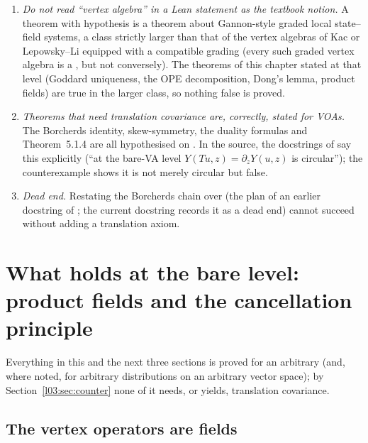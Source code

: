 \begin{warning}[title={Consequences for the reader}]
\begin{enumerate}
\item \emph{Do not read ``vertex algebra'' in a Lean statement as the textbook notion.} A theorem
  with hypothesis  is a theorem about Gannon-style graded local
  state--field systems, a class strictly larger than that of the vertex algebras of Kac or
  Lepowsky--Li equipped with a compatible grading (every such graded vertex algebra is a
  , but not conversely). The theorems of this chapter
  stated at that level (Goddard uniqueness, the OPE decomposition, Dong's lemma, product fields)
  are true in the larger class, so nothing false is proved.
\item \emph{Theorems that need translation covariance are, correctly, stated for VOAs.} The
  Borcherds identity, skew-symmetry, the duality formulas and Theorem~5.1.4 are all hypothesised
  on . In the source, the docstrings of
   say this explicitly (``at the bare-VA
  level $Y(Tu,z) = \partial_zY(u,z)$ is circular''); the counterexample shows it is not merely
  circular but false.
\item \emph{Dead end.} Restating the Borcherds chain over  (the plan of an earlier
  docstring of ; the current docstring records it as a dead end) cannot succeed
  without adding a translation axiom.
\end{enumerate}
\end{warning}

\section[The bare level: product fields, cancellation]{What holds at the bare level: product fields and the cancellation principle}\label{l03:sec:vafacts}

Everything in this and the next three sections is proved for an arbitrary 
(and, where noted, for arbitrary distributions on an arbitrary vector space); by
Section~\ref{l03:sec:counter} none of it needs, or yields, translation covariance.

\subsection{The vertex operators are fields}


